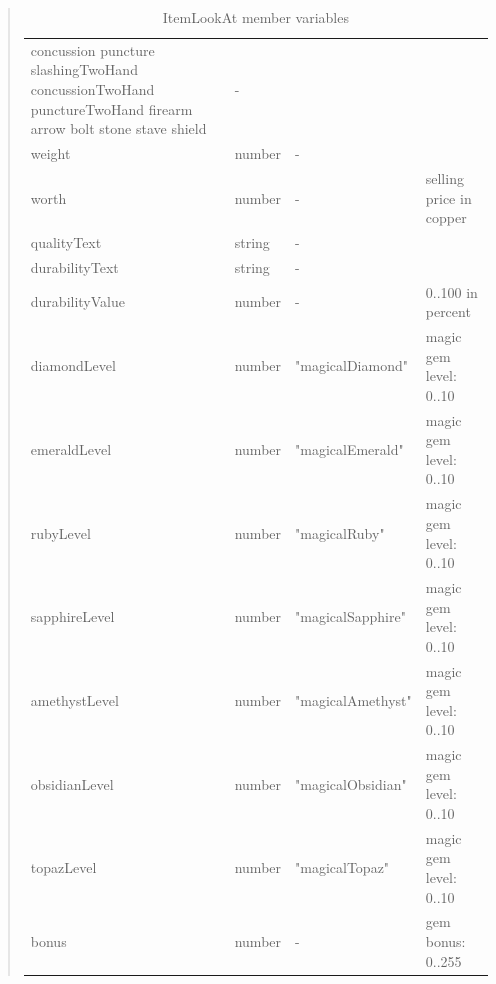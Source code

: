 \documentclass[a4paper,10pt,makeidx]{scrreprt}
\begin{document}
\begin{quote}
\begin{table}
\begin{tabular}{l|p{3.8cm}|p{3cm}|p{3.5cm}}
        \hspace*{5mm}concussion\newline
        \hspace*{5mm}puncture\newline
        \hspace*{5mm}slashingTwoHand\newline
        \hspace*{5mm}concussionTwoHand\newline
        \hspace*{5mm}punctureTwoHand\newline
        \hspace*{5mm}firearm\newline
        \hspace*{5mm}arrow\newline
        \hspace*{5mm}bolt\newline
        \hspace*{5mm}stone\newline
        \hspace*{5mm}stave\newline
        \hspace*{5mm}shield & -\\
    weight & number & -\\
    worth & number & - & selling price in copper\\
    qualityText & string & -\\
    durabilityText & string & -\\
    durabilityValue & number & - & 0..100 in percent\\
    diamondLevel & number & "magicalDiamond" & magic gem level: 0..10\\
    emeraldLevel & number & "magicalEmerald" & magic gem level: 0..10\\
    rubyLevel & number & "magicalRuby" & magic gem level: 0..10\\
    sapphireLevel & number & "magicalSapphire" & magic gem level: 0..10\\
    amethystLevel & number & "magicalAmethyst" & magic gem level: 0..10\\
    obsidianLevel & number & "magicalObsidian" & magic gem level: 0..10\\
    topazLevel & number & "magicalTopaz" & magic gem level: 0..10\\
    bonus & number & - & gem bonus: 0..255\\
\end{tabular}
\caption{ItemLookAt member variables}\label{ItemLookAt}
\end{table}

\end{quote}
\end{document}
